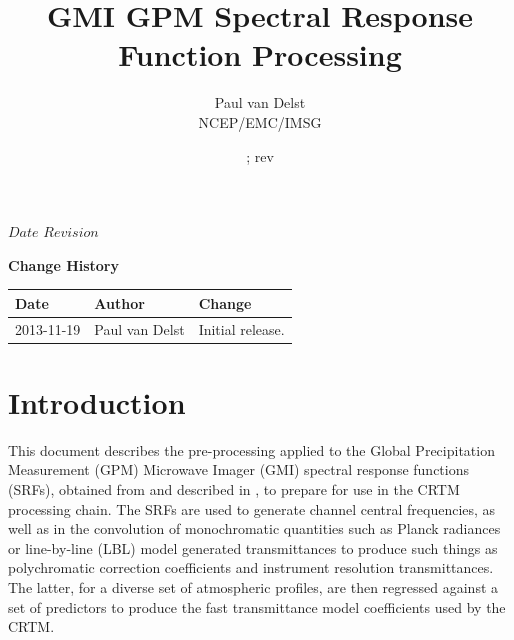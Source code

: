 



\SVN $Date$
\SVN $Revision$

\title{GMI GPM Spectral Response Function Processing}
\author{Paul van Delst\\NCEP/EMC/IMSG}
\date{\SVNDate ; rev\SVNRevision}



\maketitle

\draftwatermark

\thispagestyle{empty}
\vspace*{10cm}
\begin{center}
  {\sffamily\Large\bfseries Change History}
  \begin{table}[htp]
    \centering
    \begin{tabular}{|p{2cm}|p{3cm}|p{8cm}|}
      \hline
      \sffamily\textbf{Date} & \sffamily\textbf{Author} & \sffamily\textbf{Change}\\
      \hline\hline
      2013-11-19 & Paul van Delst & Initial release.\\
      \hline
    \end{tabular}
  \end{table}
\end{center}
\clearpage
\pagestyle{fancy}
\fancyhead[LE,RO]{\sffamily \rightmark}
\fancyhead[LO,RE]{\sffamily \leftmark}
\setcounter{page}{1}



\section{Introduction}
This document describes the pre-processing applied to the Global Precipitation Measurement (GPM) Microwave Imager (GMI) spectral response functions (SRFs), obtained from \cite{GMI_SRF_Data} and described in \citet{GMI_SER}, to prepare for use in the CRTM processing chain. The SRFs are used to generate channel central frequencies, as well as in the convolution of monochromatic quantities such as Planck radiances or line-by-line (LBL) model generated transmittances to produce such things as polychromatic correction coefficients and instrument resolution transmittances. The latter, for a diverse set of atmospheric profiles, are then regressed against a set of predictors to produce the fast transmittance model coefficients used by the CRTM.

